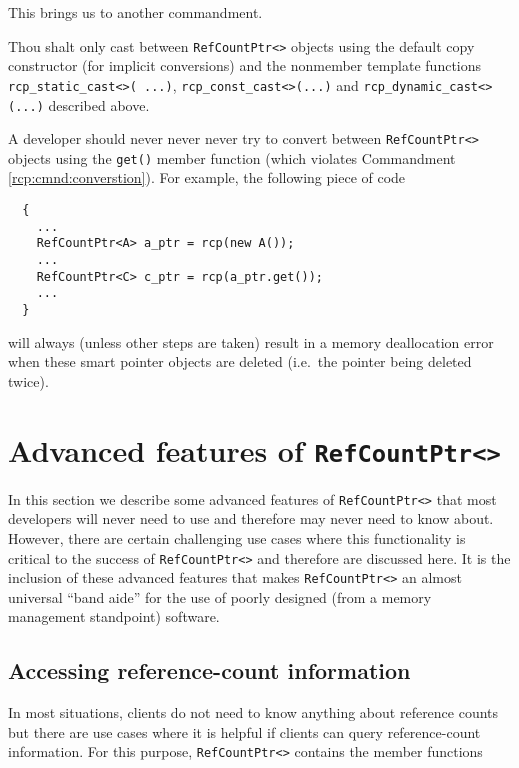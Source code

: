 This brings us to another commandment.

\begin{commandment}\label{rcp:cmnd:converstion}
Thou shalt only cast between {}\texttt{Ref\-Count\-Ptr<>} objects using the
default copy constructor (for implicit conversions) and the nonmember
template functions {}\texttt{rcp\-\_static\-\_cast<>( ...)},
{}\texttt{rcp\-\_const\-\_cast<>(...)} and
{}\texttt{rcp\-\_dynamic\-\_cast<>(...)}  described above.
\end{commandment}

A developer should never never never try to convert between
{}\texttt{Ref\-Count\-Ptr<>} objects using the {}\texttt{get()} member
function (which violates Commandment {}\ref{rcp:cmnd:converstion}).
For example, the following piece of code

{\scriptsize\begin{verbatim}
  {
    ...
    RefCountPtr<A> a_ptr = rcp(new A());
    ...
    RefCountPtr<C> c_ptr = rcp(a_ptr.get());
    ...
  }
\end{verbatim}}

{}\noindent{}will always (unless other steps are taken) result in a
memory deallocation error when these smart pointer objects are deleted
(i.e.~the pointer being deleted twice).

%
\section{Advanced features of {}\texttt{Ref\-Count\-Ptr<>}}
%

In this section we describe some advanced features of
{}\texttt{Ref\-Count\-Ptr<>} that most developers will never need to
use and therefore may never need to know about.  However, there are
certain challenging use cases where this functionality is critical to
the success of {}\texttt{Ref\-Count\-Ptr<>} and therefore are
discussed here.  It is the inclusion of these advanced features that
makes {}\texttt{Ref\-Count\-Ptr<>} an almost universal ``band aide''
for the use of poorly designed (from a memory management standpoint)
software.

%
\subsection{Accessing reference-count information}
%

In most situations, clients do not need to know anything about
reference counts but there are use cases where it is helpful if
clients can query reference-count information.  For this purpose,
{}\texttt{Ref\-Count\-Ptr<>} contains the member functions

